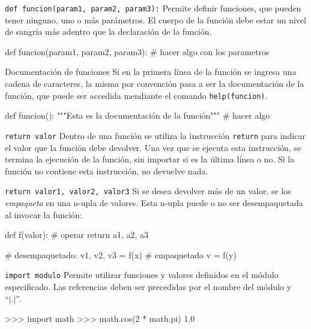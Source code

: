 \begin{referencia_python}

\begin{sintaxis}{\lstinline!def funcion(param1, param2, param3):!}
Permite definir funciones, que pueden tener ninguno, uno o más
parámetros.  El cuerpo de la función debe estar un nivel de sangría
más adentro que la declaración de la función.

\begin{codigo-python-sn}
def funcion(param1, param2, param3):
    # hacer algo con los parametros
\end{codigo-python-sn}
\end{sintaxis}

\begin{sintaxis}{Documentación de funciones}
Si en la primera línea de la función se ingresa una cadena de
caracteres, la misma por convención pasa a ser la documentación
de la función, que puede ser accedida mendiante el comando
\lstinline!help(funcion)!.
\begin{codigo-python-sn}
def funcion():
    """Esta es la documentación de la función"""
    # hacer algo
\end{codigo-python-sn}
\end{sintaxis}

\begin{sintaxis}{\lstinline!return valor!}
Dentro de una función se utiliza la instrucción \lstinline!return!
para indicar el valor que la función debe devolver.
Una vez que se ejecuta esta instrucción, se termina la ejecución de la
función, sin importar si es la última línea o no.
Si la función no contiene esta instrucción, no devuelve nada.
\end{sintaxis}

\begin{sintaxis}{\lstinline!return valor1, valor2, valor3!}
Si se desea devolver más de un valor, se los {\em empaqueta} en
una n-upla de valores.  Esta n-upla puede o no ser desempaquetada al
invocar la función:
\begin{codigo-python-sn}
def f(valor):
    # operar
    return a1, a2, a3

# desempaquetado:
v1, v2, v3 = f(x)
# empaquetado
v = f(y)
\end{codigo-python-sn}
\end{sintaxis}

\begin{sintaxis}{\lstinline!import modulo!}
Permite utilizar funciones y valores definidos en el módulo especificado.
Las referencias deben ser precedidas por el nombre del módulo y ``|.|''.
\begin{codigo-python-sn}
>>> import math
>>> math.cos(2 * math.pi)
1.0
\end{codigo-python-sn}
\end{sintaxis}


\end{referencia_python}
